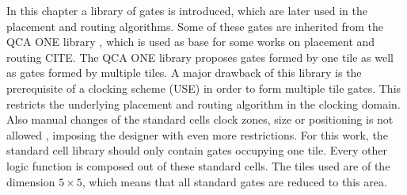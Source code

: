 In this chapter a library of gates is introduced, which are later used in the placement and routing algorithms. Some of these gates are inherited from the QCA ONE library \cite{QCA_scl}, which is used as base for some works on placement and routing CITE.
The QCA ONE library proposes gates formed by one tile as well as gates formed by multiple tiles. A major drawback of this library is the prerequisite of a clocking scheme (USE) in order to form multiple tile gates. This restricts the underlying placement and routing algorithm in the clocking domain. Also manual changes of the standard cells clock zones, size or positioning is not allowed \cite{QCA_scl}, imposing the designer with even more restrictions. For this work, the standard cell library should only contain gates occupying one tile. Every other logic function is composed out of these standard cells. The tiles used are of the dimension $5 \times 5$, which means that all standard gates are reduced to this area.\\
